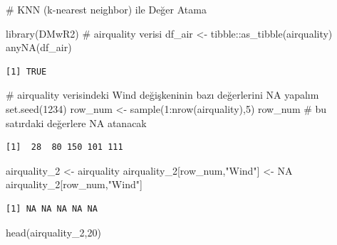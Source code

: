 \documentclass[
  letterpaper,
  DIV=11,
  numbers=noendperiod]{scrreprt}
\newenvironment{Shaded}{\begin{snugshade}}{\end{snugshade}}
\newcommand{\CommentTok}[1]{\textcolor[rgb]{0.37,0.37,0.37}{#1}}
\newcommand{\ConstantTok}[1]{\textcolor[rgb]{0.56,0.35,0.01}{#1}}
\newcommand{\DecValTok}[1]{\textcolor[rgb]{0.68,0.00,0.00}{#1}}
\newcommand{\FunctionTok}[1]{\textcolor[rgb]{0.28,0.35,0.67}{#1}}
\newcommand{\NormalTok}[1]{\textcolor[rgb]{0.00,0.23,0.31}{#1}}
\newcommand{\OtherTok}[1]{\textcolor[rgb]{0.00,0.23,0.31}{#1}}
\newcommand{\SpecialCharTok}[1]{\textcolor[rgb]{0.37,0.37,0.37}{#1}}
\newcommand{\StringTok}[1]{\textcolor[rgb]{0.13,0.47,0.30}{#1}}
\begin{document}
\begin{Shaded}
\begin{Highlighting}[]
\CommentTok{\# KNN (k{-}nearest neighbor) ile Değer Atama}

\FunctionTok{library}\NormalTok{(DMwR2)}
\CommentTok{\# airquality verisi}
\NormalTok{df\_air }\OtherTok{\textless{}{-}}\NormalTok{ tibble}\SpecialCharTok{::}\FunctionTok{as\_tibble}\NormalTok{(airquality)}
\FunctionTok{anyNA}\NormalTok{(df\_air)}
\end{Highlighting}
\end{Shaded}

\begin{verbatim}
[1] TRUE
\end{verbatim}

\begin{Shaded}
\begin{Highlighting}[]
\CommentTok{\# airquality verisindeki Wind değişkeninin bazı değerlerini NA yapalım}
\FunctionTok{set.seed}\NormalTok{(}\DecValTok{1234}\NormalTok{)}
\NormalTok{row\_num }\OtherTok{\textless{}{-}} \FunctionTok{sample}\NormalTok{(}\DecValTok{1}\SpecialCharTok{:}\FunctionTok{nrow}\NormalTok{(airquality),}\DecValTok{5}\NormalTok{)}
\NormalTok{row\_num }\CommentTok{\# bu satırdaki değerlere NA atanacak}
\end{Highlighting}
\end{Shaded}

\begin{verbatim}
[1]  28  80 150 101 111
\end{verbatim}

\begin{Shaded}
\begin{Highlighting}[]
\NormalTok{airquality\_2 }\OtherTok{\textless{}{-}}\NormalTok{ airquality}
\NormalTok{airquality\_2[row\_num,}\StringTok{"Wind"}\NormalTok{] }\OtherTok{\textless{}{-}} \ConstantTok{NA}
\NormalTok{airquality\_2[row\_num,}\StringTok{"Wind"}\NormalTok{]}
\end{Highlighting}
\end{Shaded}

\begin{verbatim}
[1] NA NA NA NA NA
\end{verbatim}

\begin{Shaded}
\begin{Highlighting}[]
\FunctionTok{head}\NormalTok{(airquality\_2,}\DecValTok{20}\NormalTok{)}
\end{Highlighting}
\end{Shaded}
\end{document}
